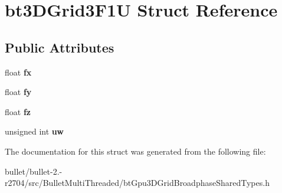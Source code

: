 \hypertarget{structbt3_d_grid3_f1_u}{\section{bt3\+D\+Grid3\+F1\+U Struct Reference}
\label{structbt3_d_grid3_f1_u}
}
\subsection*{Public Attributes}
\begin{DoxyCompactItemize}
\item 
\hypertarget{structbt3_d_grid3_f1_u_a5e1e6c6a20f65a50259b8c44082eca3f}{float {\bfseries fx}}\label{structbt3_d_grid3_f1_u_a5e1e6c6a20f65a50259b8c44082eca3f}

\item 
\hypertarget{structbt3_d_grid3_f1_u_adfcada84eac79f91d37f817762770e56}{float {\bfseries fy}}\label{structbt3_d_grid3_f1_u_adfcada84eac79f91d37f817762770e56}

\item 
\hypertarget{structbt3_d_grid3_f1_u_a1cec9f965c5d5bfad96347fe45c7bc91}{float {\bfseries fz}}\label{structbt3_d_grid3_f1_u_a1cec9f965c5d5bfad96347fe45c7bc91}

\item 
\hypertarget{structbt3_d_grid3_f1_u_ad8909c1bc5646a40ce03af11851a1004}{unsigned int {\bfseries uw}}\label{structbt3_d_grid3_f1_u_ad8909c1bc5646a40ce03af11851a1004}

\end{DoxyCompactItemize}


The documentation for this struct was generated from the following file\+:\begin{DoxyCompactItemize}
\item 
bullet/bullet-\/2.-\/r2704/src/\+Bullet\+Multi\+Threaded/bt\+Gpu3\+D\+Grid\+Broadphase\+Shared\+Types.\+h\end{DoxyCompactItemize}
